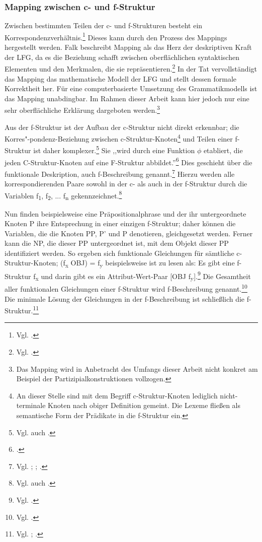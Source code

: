 \documentclass[12pt,a4paper]{article}
\begin{document}
\subsubsection{Mapping zwischen c- und f-Struktur}
Zwischen bestimmten Teilen der c- und f-Strukturen besteht ein Korrespondenzverhältnis.\footnote{Vgl. \cite[8]{Skript}.} Dieses kann durch den Prozess des Mappings hergestellt werden. Falk beschreibt Mapping als das Herz der deskriptiven Kraft der LFG, da es die Beziehung schafft zwischen oberflächlichen syntaktischen Elementen und den Merkmalen, die sie repräsentieren.\footnote{Vgl. \cite[62; 68]{Falk}.} In der Tat vervollständigt das Mapping das mathematische Modell der LFG und stellt dessen formale Korrektheit her. Für eine computerbasierte Umsetzung des Grammatikmodells ist das Mapping unabdingbar. Im Rahmen dieser Arbeit kann hier jedoch nur eine sehr oberflächliche Erklärung dargeboten werden.\footnote{Das Mapping wird in Anbetracht des Umfangs dieser Arbeit nicht konkret am Beispiel der Partizipialkonstruktionen vollzogen.}

Aus der f-Struktur ist der Aufbau der c-Struktur nicht direkt erkennbar; die Korres"-pondenz-Beziehung zwischen c-Struktur-Knoten\footnote{An dieser Stelle sind mit dem Begriff c-Struktur-Knoten lediglich nicht-terminale Knoten nach obiger Definition gemeint. Die Lexeme fließen als semantische Form der Prädikate in die f-Struktur ein.} und Teilen einer f-Struktur ist daher komplexer.\footnote{Vgl. auch \cite[55]{Falk}.} Sie ,,wird durch eine Funktion $\phi$ etabliert, die jeden C-Struktur-Knoten auf eine F-Struktur abbildet.''\footnote{\cite[8]{Skript}.} Dies geschieht über die funktionale Deskription, auch f-Beschreibung genannt.\footnote{Vgl. \cite[63-4]{Falk}; \cite[34]{Rohrer}; \cite[17]{Skript}.} Hierzu werden alle korrespondierenden Paare sowohl in der c- als auch in der f-Struktur durch die Variablen f\textsubscript{1}, f\textsubscript{2}, ... f\textsubscript{n} gekennzeichnet.\footnote{Vgl. auch \cite[65]{Falk}.} 

Nun finden beispielsweise eine Präpositionalphrase und der ihr untergeordnete Knoten P ihre Entsprechung in einer einzigen f-Struktur; daher können die Variablen, die die Knoten PP, P' und P denotieren, gleichgesetzt werden. Ferner kann die NP, die dieser PP untergeordnet ist, mit dem Objekt dieser PP identifiziert werden. So ergeben sich funktionale Gleichungen für sämtliche c-Struktur-Knoten; (f\textsubscript{x} OBJ) = f\textsubscript{y} beispielsweise ist zu lesen als: Es gibt eine f-Struktur f\textsubscript{x} und darin gibt es ein Attribut-Wert-Paar [OBJ f\textsubscript{y}].\footnote{Vgl. \cite[12]{Skript}.}
Die Gesamtheit aller funktionalen Gleichungen einer f-Struktur wird f-Beschreibung genannt.\footnote{Vgl. \cite[66-8]{Falk}.} Die minimale Lösung der Gleichungen in der f-Beschreibung ist schließlich die f-Struktur.\footnote{Vgl. \cite[68]{Falk}; \cite[17]{Skript}.}
\end{document}
